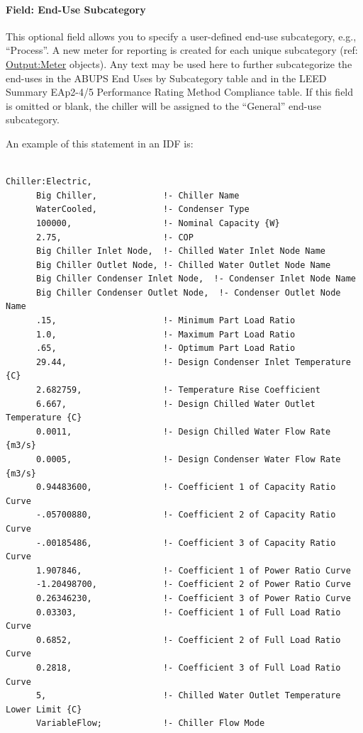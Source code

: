 \paragraph{Field: End-Use Subcategory}\label{end-use-subcategory-13}

This optional field allows you to specify a user-defined end-use subcategory, e.g., ``Process''. A new meter for reporting is created for each unique subcategory (ref: \hyperref[outputmeter-and-outputmetermeterfileonly]{Output:Meter} objects). Any text may be used here to further subcategorize the end-uses in the ABUPS End Uses by Subcategory table and in the LEED Summary EAp2-4/5 Performance Rating Method Compliance table. If this field is omitted or blank, the chiller will be assigned to the ``General'' end-use subcategory.


An example of this statement in an IDF is:

\begin{lstlisting}

Chiller:Electric,
      Big Chiller,             !- Chiller Name
      WaterCooled,             !- Condenser Type
      100000,                  !- Nominal Capacity {W}
      2.75,                    !- COP
      Big Chiller Inlet Node,  !- Chilled Water Inlet Node Name
      Big Chiller Outlet Node, !- Chilled Water Outlet Node Name
      Big Chiller Condenser Inlet Node,  !- Condenser Inlet Node Name
      Big Chiller Condenser Outlet Node,  !- Condenser Outlet Node Name
      .15,                     !- Minimum Part Load Ratio
      1.0,                     !- Maximum Part Load Ratio
      .65,                     !- Optimum Part Load Ratio
      29.44,                   !- Design Condenser Inlet Temperature {C}
      2.682759,                !- Temperature Rise Coefficient
      6.667,                   !- Design Chilled Water Outlet Temperature {C}
      0.0011,                  !- Design Chilled Water Flow Rate {m3/s}
      0.0005,                  !- Design Condenser Water Flow Rate {m3/s}
      0.94483600,              !- Coefficient 1 of Capacity Ratio Curve
      -.05700880,              !- Coefficient 2 of Capacity Ratio Curve
      -.00185486,              !- Coefficient 3 of Capacity Ratio Curve
      1.907846,                !- Coefficient 1 of Power Ratio Curve
      -1.20498700,             !- Coefficient 2 of Power Ratio Curve
      0.26346230,              !- Coefficient 3 of Power Ratio Curve
      0.03303,                 !- Coefficient 1 of Full Load Ratio Curve
      0.6852,                  !- Coefficient 2 of Full Load Ratio Curve
      0.2818,                  !- Coefficient 3 of Full Load Ratio Curve
      5,                       !- Chilled Water Outlet Temperature Lower Limit {C}
      VariableFlow;            !- Chiller Flow Mode
\end{lstlisting}

